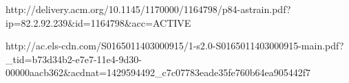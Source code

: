 \documentclass[11pt]{informatics-report}
\begin{document}
http://delivery.acm.org/10.1145/1170000/1164798/p84-astrain.pdf?ip=82.2.92.239&id=1164798&acc=ACTIVE%

http://ac.els-cdn.com/S0165011403000915/1-s2.0-S0165011403000915-main.pdf?_tid=b73d34b2-e7e7-11e4-9d30-00000aacb362&acdnat=1429594492_c7c07783eade35fe760b64ea905442f7


%
%
%
%
%
%






\appendix

%
%
\end{document}
